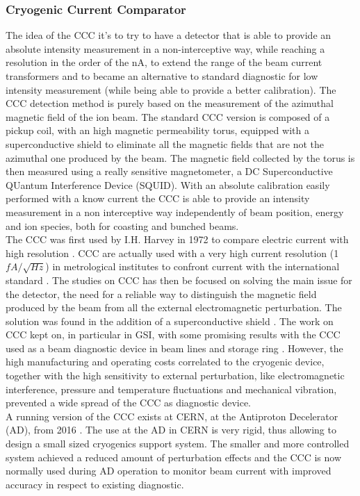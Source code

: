 \documentclass[12pt,a4paper]{report}
\begin{document}
	\subsubsection{Cryogenic Current Comparator}
	The idea of the CCC it's to try to have a detector that is able to provide an absolute intensity measurement in a non-interceptive way, while reaching a resolution in the order of the nA, to extend the range of the beam current transformers and to became an alternative to standard diagnostic for low intensity measurement (while being able to provide a better calibration). The CCC detection method is purely based on the measurement of the azimuthal magnetic field of the ion beam. The standard CCC version is composed of a pickup coil, with an high magnetic permeability torus, equipped with a superconductive shield to eliminate all the magnetic fields that are not the azimuthal one produced by the beam. The magnetic field collected by the torus is then measured using a really sensitive magnetometer, a DC Superconductive QUantum Interference Device (SQUID). With an absolute calibration easily performed with a know current the CCC is able to provide an intensity measurement in a non interceptive way independently of beam position, energy and ion species, both for coasting and bunched beams. \\
	The CCC was first used by I.H. Harvey in 1972 to compare electric current with high resolution \cite{Harvey_CCC}. CCC are actually used with a very high current resolution (1 $fA/ \sqrt{Hz}$) in metrological institutes to confront current with the international standard \cite{Handbook_squid}.  The studies on CCC has then be focused on solving the main issue for the detector, the need for a reliable way to distinguish the magnetic field produced by the beam from all the external electromagnetic perturbation. The solution was found in the addition of a superconductive shield \cite{GrohmannCCC}. The work on CCC kept on, in particular in GSI, with some promising results with the CCC used as a beam diagnostic device in beam lines and storage ring \cite{PetersCCC}. However, the high manufacturing and operating costs correlated to the cryogenic device, together with the high sensitivity to external perturbation, like electromagnetic interference, pressure and temperature fluctuations and mechanical vibration, prevented a wide spread of the CCC as diagnostic device.\\
	A running version of the CCC exists at CERN, at the Antiproton Decelerator (AD), from 2016 \cite{CERNCCC_1}\cite{CERNCCC_2}. The use at the AD in CERN is very rigid, thus allowing to design a small sized cryogenics support system. The smaller and more controlled system achieved a reduced amount of perturbation effects and the CCC is now normally used during AD operation to monitor beam current with improved accuracy in respect to existing diagnostic. \\
\end{document}
